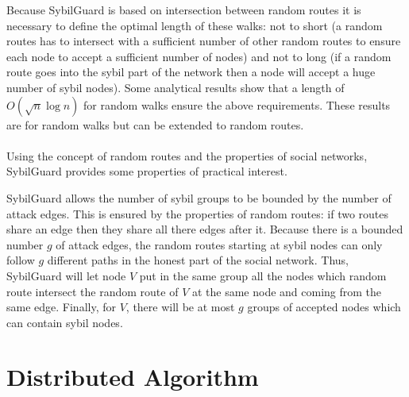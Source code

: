 \documentclass[a4paper,11pt]{article}
\begin{document}
Because SybilGuard is based on intersection between random routes it is necessary to define the optimal length of these walks: not to short (a random routes has to intersect with a sufficient number of other random routes to ensure each node to accept a sufficient number of nodes) and not to long (if a random route goes into the sybil part of the network then a node will accept a huge number of sybil nodes).
Some analytical results show that a length of $O(\sqrt{n} \log n)$ for random walks ensure the above requirements. 
These results are for random walks but can be extended to random routes.

 



\paragraph{}
Using the concept of random routes and the properties of social networks, SybilGuard provides some properties of practical interest.

SybilGuard allows the number of sybil groups to be bounded by the number of attack edges.
This is ensured by the properties of random routes: if two routes share an edge then they share all there edges after it.
Because there is a bounded number $g$ of attack edges, the random routes starting at sybil nodes can only follow $g$ different paths in the honest part of the social network.
Thus, SybilGuard will let node $V$ put in the same group all the nodes which random route intersect the random route of $V$ at the same node and coming from the same edge.
Finally, for $V$, there will be at most $g$ groups of accepted nodes which can contain sybil nodes. 


\section{Distributed Algorithm}



\end{document}
